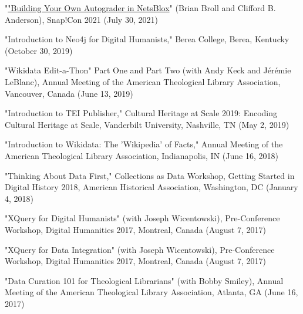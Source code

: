 \documentclass[]{res} %
\begin{document}
\begin{resume}
\begin{hangparas}{.25in}{1}"\href{https://www.snapcon.org/conferences/2021/program/proposals/235}{"Building Your Own Autograder in NetsBlox}" (Brian Broll and Clifford B. Anderson), Snap!Con 2021 (July 30, 2021)\end{hangparas}

\begin{hangparas}{.25in}{1}"Introduction to Neo4j for Digital Humanists," Berea College, Berea, Kentucky (October 30, 2019)\end{hangparas}

\begin{hangparas}{.25in}{1}"Wikidata Edit-a-Thon" Part One and Part Two (with Andy Keck and Jérémie LeBlanc), Annual Meeting of the American Theological Library Association, Vancouver, Canada (June 13, 2019)\end{hangparas}

\begin{hangparas}{.25in}{1}"Introduction to TEI Publisher," Cultural Heritage at Scale 2019: Encoding Cultural Heritage at Scale, Vanderbilt University, Nashville, TN (May 2, 2019)\end{hangparas}

\begin{hangparas}{.25in}{1}"Introduction to Wikidata: The 'Wikipedia' of Facts," Annual Meeting of the American Theological Library Association, Indianapolis, IN (June 16, 2018)\end{hangparas}

\begin{hangparas}{.25in}{1}"Thinking About Data First," Collections as Data Workshop, Getting Started in Digital History 2018, American Historical Association, Washington, DC (January 4, 2018)\end{hangparas}

\begin{hangparas}{.25in}{1}"XQuery for Digital Humanists" (with Joseph Wicentowski), Pre-Conference Workshop, Digital Humanities 2017, Montreal, Canada (August 7, 2017)\end{hangparas}

\begin{hangparas}{.25in}{1}"XQuery for Data Integration" (with Joseph Wicentowski), Pre-Conference Workshop, Digital Humanities 2017, Montreal, Canada (August 7, 2017)\end{hangparas}

\begin{hangparas}{.25in}{1}"Data Curation 101 for Theological Librarians" (with Bobby Smiley), Annual Meeting of the American Theological Library Association, Atlanta, GA (June 16, 2017)\end{hangparas}


\end{resume}
\end{document}
